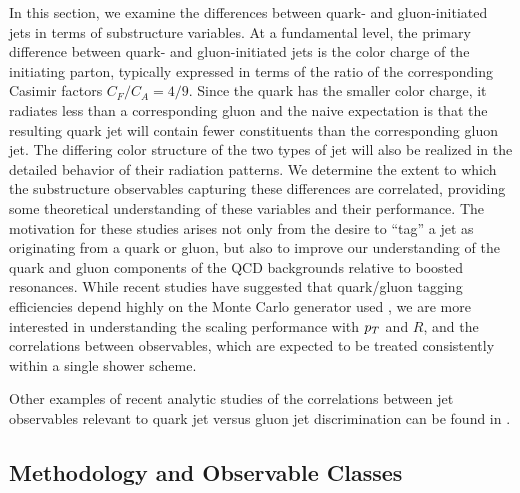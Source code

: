 In this section, we examine the differences between quark- and
gluon-initiated jets in terms of substructure variables. At a fundamental level, the primary difference between quark-  and gluon-initiated jets is the color charge of the initiating parton, typically expressed in terms of the
ratio of the corresponding Casimir factors $C_F/C_A = 4/9$.  
Since the quark has the smaller color charge, it radiates less than a
corresponding
gluon and the naive expectation is that the resulting quark jet will contain
fewer constituents than the corresponding gluon jet. The differing color
structure of the two types of jet will also be realized in the detailed
behavior of their radiation patterns.  
We determine the extent to which the substructure observables capturing these differences are correlated, 
providing some theoretical understanding of these
variables and their performance. 
The motivation for these studies
arises not only from the
desire to ``tag'' a jet as originating from a quark or gluon, but also
to improve our  understanding of the quark and gluon components of the
QCD backgrounds relative to boosted resonances.  While recent studies
have suggested that quark/gluon tagging efficiencies depend highly on
the Monte Carlo generator used \cite{Aad:2014gea,Gallicchio:2012ez}, we are more interested in
understanding the scaling performance with $p_T$ and $R$, and the
correlations between observables, which are expected to be treated
consistently within a single shower scheme.

Other examples of recent analytic studies of the correlations between jet observables
relevant to quark jet versus gluon jet discrimination can be found in
\cite{Larkoski:2013paa, Larkoski:2014tva, Larkoski:2014pca, Procura:2014cba}.

\subsection{Methodology and Observable Classes}

